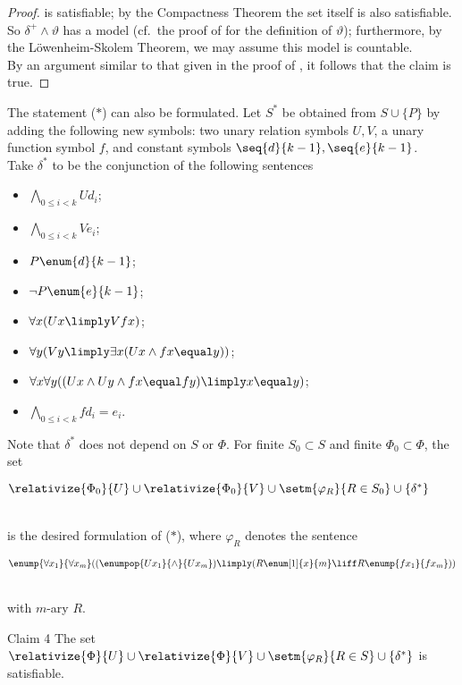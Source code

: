 \begin{enumerate}[1.]
\begin{proof}
is satisfiable; by the Compactness Theorem the set itself is also satisfiable.\bigskip\\
So $\delta^+ \land \vartheta$ has a model (cf.\ the proof of  for the definition of $\vartheta$); furthermore, by the L\"{o}wenheim-Skolem Theorem, we may assume this model is countable.\bigskip\\
By an argument similar to that given in the proof of , it follows that the claim is true.
\end{proof}
The statement ($\ast$) can also be formulated. Let $S^\ast$ be obtained from $S \cup \{ P \}$ by adding the following new symbols: two unary relation symbols $U, V$, a unary function symbol $f$, and constant symbols $\seq{d}{k - 1}, \seq{e}{k - 1}$.\bigskip\\
Take $\delta^\ast$ to be the conjunction of the following sentences
\begin{itemize}
\item $\bigwedge_{0 \leq i < k} Ud_i$;
\item $\bigwedge_{0 \leq i < k} Ve_i$;
\item $P\enum{d}{k - 1}$;
\item $\neg P\enum{e}{k - 1}$;
\item $\forall x (Ux \limply Vfx)$;
\item $\forall y (Vy \limply \exists x (Ux \land fx \equal y))$;
\item $\forall x \forall y ((Ux \land Uy \land fx \equal fy) \limply x \equal y)$;
\item $\bigwedge_{0 \leq i < k} fd_i \equal e_i$.
\end{itemize}
Note that $\delta^\ast$ does not depend on $S$ or $\Phi$. For finite $S_0 \subset S$ and finite $\Phi_0 \subset \Phi$, the set\smallskip\\
\centerline{$\relativize{\Phi_0}{U} \cup \relativize{\Phi_0}{V} \cup \setm{\varphi_R}{R \in S_0} \cup \{ \delta^\ast \}$}\smallskip\\
is the desired formulation of ($\ast$), where $\varphi_R$ denotes the sentence\smallskip\\
\centerline{$\enump{\forall x_1}{\forall x_m} ((\enumpop{Ux_1}{\land}{Ux_m}) \limply (R\enum[1]{x}{m} \liff R\enump{fx_1}{fx_m}))$}\smallskip\\
with $m$-ary $R$.\bigskip\\
\begin{theorem}{Claim 4}
The set $\relativize{\Phi}{U} \cup \relativize{\Phi}{V} \cup \setm{\varphi_R}{R \in S} \cup \{ \delta^\ast \}$ is satisfiable.

\end{theorem}
\end{enumerate}
